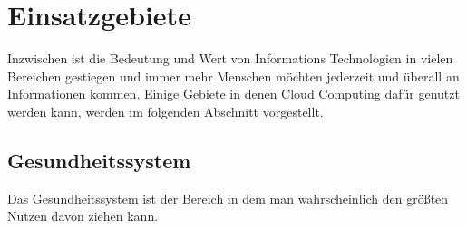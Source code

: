 \section{Einsatzgebiete}
Inzwischen ist die Bedeutung und Wert von Informations Technologien in vielen Bereichen gestiegen und immer mehr Menschen möchten jederzeit und überall an Informationen kommen. Einige Gebiete in denen Cloud Computing dafür genutzt werden kann, werden im folgenden Abschnitt vorgestellt.

\subsection{Gesundheitssystem}
Das Gesundheitssystem ist der Bereich in dem man wahrscheinlich den größten Nutzen davon ziehen kann.